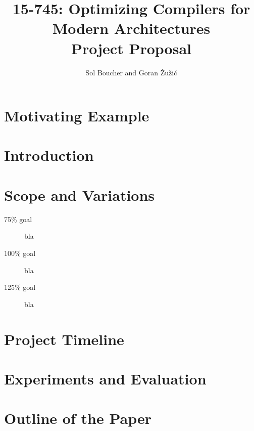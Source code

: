 \documentclass[12pt]{article}
\title{{\small 15-745: Optimizing Compilers for Modern Architectures} \\ Project Proposal}
\author{Sol Boucher and Goran \v{Z}u\v{z}i\'c}
\begin{document}
\maketitle

\section{Motivating Example}

\section{Introduction}


\section{Scope and Variations}

\begin{description}
\item [75\% goal] bla
\item [100\% goal] bla
\item [125\% goal] bla
\end{description}

\section{Project Timeline}

\section{Experiments and Evaluation}

\section{Outline of the Paper}

\end{document}
